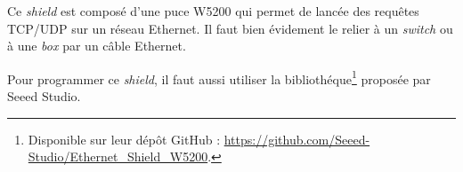 Ce \emph{shield} est composé d'une puce W5200 qui permet de lancée des requêtes TCP/UDP sur un réseau Ethernet. Il faut bien évidement le relier à un \emph{switch} ou à une \emph{box} par un câble Ethernet.

\Espace

Pour programmer ce \emph{shield}, il faut aussi utiliser la bibliothéque\footnote{Disponible sur leur dépôt GitHub : \url{https://github.com/Seeed-Studio/Ethernet_Shield_W5200}.} proposée par Seeed Studio.

